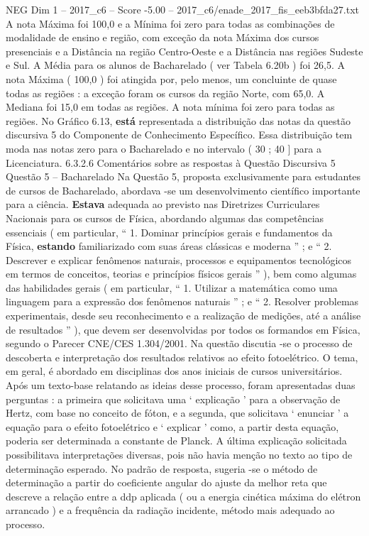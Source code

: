 \begin{textsample}{NEG Dim 1 – 2017\_c6 – Score -5.00 – 2017\_c6/enade\_2017\_fis\_eeb3bfda27.txt}
A nota Máxima foi 100,0 e a Mínima foi zero para todas as combinações de modalidade de ensino e região, com exceção da nota Máxima dos cursos presenciais e a Distância na região Centro-Oeste e a Distância nas regiões Sudeste e Sul.
A Média para os alunos de Bacharelado ( ver Tabela 6.20b ) foi 26,5.
A nota Máxima ( 100,0 ) foi atingida por, pelo menos, um concluinte de quase todas as regiões : a exceção foram os cursos da região Norte, com 65,0.
A Mediana foi 15,0 em todas as regiões.
A nota mínima foi zero para todas as regiões.
No Gráfico 6.13, \textbf{está} representada a distribuição das notas da questão discursiva 5 do Componente de Conhecimento Específico.
Essa distribuição tem moda nas notas zero para o Bacharelado e no intervalo ( 30 ; 40 ] para a Licenciatura. 6.3.2.6 Comentários sobre as respostas à Questão Discursiva 5 Questão 5 – Bacharelado Na Questão 5, proposta exclusivamente para estudantes de cursos de Bacharelado, abordava -se um desenvolvimento científico importante para a ciência. \textbf{Estava} adequada ao previsto nas Diretrizes Curriculares Nacionais para os cursos de Física, abordando algumas das competências essenciais ( em particular, “ 1.
Dominar princípios gerais e fundamentos da Física, \textbf{estando} familiarizado com suas áreas clássicas e moderna ” ; e “ 2.
Descrever e explicar fenômenos naturais, processos e equipamentos tecnológicos em termos de conceitos, teorias e princípios físicos gerais ” ), bem como algumas das habilidades gerais ( em particular, “ 1.
Utilizar a matemática como uma linguagem para a expressão dos fenômenos naturais ” ; e “ 2.
Resolver problemas experimentais, desde seu reconhecimento e a realização de medições, até a análise de resultados ” ), que devem ser desenvolvidas por todos os formandos em Física, segundo o Parecer CNE/CES 1.304/2001.
Na questão discutia -se o processo de descoberta e interpretação dos resultados relativos ao efeito fotoelétrico.
O tema, em geral, é abordado em disciplinas dos anos iniciais de cursos universitários.
Após um texto-base relatando as ideias desse processo, foram apresentadas duas perguntas : a primeira que solicitava uma ‘ explicação ’ para a observação de Hertz, com base no conceito de fóton, e a segunda, que solicitava ‘ enunciar ’ a equação para o efeito fotoelétrico e ‘ explicar ’ como, a partir desta equação, poderia ser determinada a constante de Planck.
A última explicação solicitada possibilitava interpretações diversas, pois não havia menção no texto ao tipo de determinação esperado.
No padrão de resposta, sugeria -se o método de determinação a partir do coeficiente angular do ajuste da melhor reta que descreve a relação entre a ddp aplicada ( ou a energia cinética máxima do elétron arrancado ) e a frequência da radiação incidente, método mais adequado ao processo.

\end{textsample}
